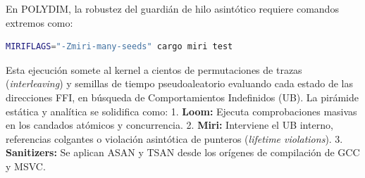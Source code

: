 En POLYDIM, la robustez del guardián de hilo asintótico requiere comandos extremos como:
\begin{lstlisting}[language=bash]
MIRIFLAGS="-Zmiri-many-seeds" cargo miri test
\end{lstlisting}

Esta ejecución somete al kernel a cientos de permutaciones de trazas (\textit{interleaving}) y semillas de tiempo pseudoaleatorio evaluando cada estado de las direcciones FFI, en búsqueda de Comportamientos Indefinidos (UB). La pirámide estática y analítica se solidifica como:
1. \textbf{Loom:} Ejecuta comprobaciones masivas en los candados atómicos y concurrencia.
2. \textbf{Miri:} Interviene el UB interno, referencias colgantes o violación asintótica de punteros (\textit{lifetime violations}).
3. \textbf{Sanitizers:} Se aplican ASAN y TSAN desde los orígenes de compilación de GCC y MSVC.
